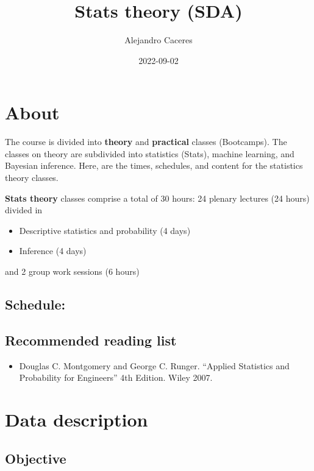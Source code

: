 \documentclass[
]{book}
\title{Stats theory (SDA)}
\author{Alejandro Caceres}
\date{2022-09-02}
\providecommand{\tightlist}{%
  \setlength{\itemsep}{0pt}\setlength{\parskip}{0pt}}
\begin{document}
\maketitle

{
\setcounter{tocdepth}{1}
\tableofcontents
}
\hypertarget{about}{%
\chapter{About}\label{about}}

The course is divided into \textbf{theory} and \textbf{practical} classes (Bootcamps). The classes on theory are subdivided into statistics (Stats), machine learning, and Bayesian inference. Here, are the times, schedules, and content for the statistics theory classes.

\textbf{Stats theory} classes comprise a total of 30 hours: 24 plenary lectures (24 hours) divided in

\begin{itemize}
\tightlist
\item
  Descriptive statistics and probability (4 days)
\item
  Inference (4 days)
\end{itemize}

and 2 group work sessions (6 hours)

\hypertarget{schedule}{%
\section{Schedule:}\label{schedule}}

\hypertarget{recommended-reading-list}{%
\section{Recommended reading list}\label{recommended-reading-list}}

\begin{itemize}
\tightlist
\item
  Douglas C. Montgomery and George C. Runger. ``Applied Statistics and Probability for Engineers'' 4th Edition. Wiley 2007.
\end{itemize}

\hypertarget{data-description}{%
\chapter{Data description}\label{data-description}}

\hypertarget{objective}{%
\section{Objective}\label{objective}}
\end{document}
